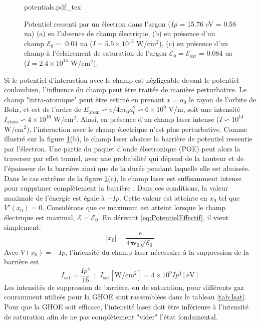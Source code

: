 \begin{figure}
\centering
\def\svgwidth{\columnwidth}
{potentials.pdf_tex}
\caption{Potentiel ressenti par un électron dans l'argon ($Ip$ = 15.76 eV = 0.58 ua) (a) en l'absence de champ électrique, (b) en présence d'un champ $\mathcal{E}_0 =$ 0.04 ua ($I = 5.5 \times 10^{13}$ W/cm$^2$), (c) en présence d'un champ à l'éclairement de saturation de l'argon $\mathcal{E}_0 = \mathcal{E}_{\text{sat}}$ = 0.084 ua ($I = 2.4 \times 10^{14}$ W/cm$^2$).}
\label{fig:potentials}
\end{figure}

Si le potentiel d'interaction avec le champ est négligeable devant le potentiel coulombien, l'influence du champ peut être traitée de manière perturbative. Le champ "intra-atomique" peut être estimé en prenant $x = a_0$ le rayon de l'orbite de Bohr, et est de l'ordre de $E_{\text{atom}} \backsim e/4\pi \epsilon_0 a_0^2 \backsim 6 \times 10^9$ V/m, soit une intensité $I_\text{atom} \backsim 4 \times 10^{16}$ W/cm$^2$. Ainsi, en présence d'un champ laser intense ($I \backsim 10^{14}$ W/cm$^2$), l'interaction avec le champ électrique n'est plus perturbative. Comme illustré sur la figure \ref{fig:potentials}(b), le champ laser abaisse la barrière de potentiel ressentie par l'électron. Une partie du paquet d'onde électronique (POE) peut alors la traverser par effet tunnel, avec une probabilité qui dépend de la hauteur et de l'épaisseur de la barrière ainsi que de la durée pendant laquelle elle est abaissée. Dans le cas extrême de la figure \ref{fig:potentials}(c), le champ laser est suffisamment intense pour supprimer complètement la barrière . Dans ces conditions, la valeur maximale de l'énergie est égale à $-Ip$. Cette valeur est atteinte en $x_0$ tel que $V'(x_0) = 0$. Considérons que ce maximum est atteint lorsque le champ électrique est maximal, $\mathcal{E} = \mathcal{E}_0$. En dérivant \ref{eq:PotentielEffectif}, il vient simplement:
\begin{equation}
|x_0| = \frac{e}{4\pi \epsilon_0 \sqrt{\mathcal{E}_0}}
\end{equation}
Avec $V(x_0) = - Ip$, l'intensité du champ laser nécessaire à la suppression de la barrière est 
\begin{equation}
I_{\text{sat}} = \frac{Ip^4}{16} \: \: ; \: \: I_{\text{sat}} [\text{W/cm$^2$}] = 4 \times 10^9 Ip^4 [\text{eV}]
\end{equation}
Les intensités de suppression de barrière, ou de saturation, pour différents gaz couramment utilisés pour la GHOE sont rassemblées dans le tableau \ref{tab:Isat}. Pour que la GHOE soit efficace, l'intensité laser doit être inférieure à l'intensité de saturation afin de ne pas complètement "vider" l'état fondamental. 

